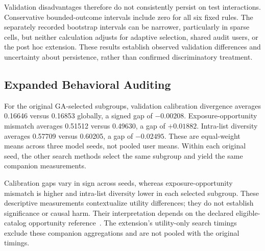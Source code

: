 Validation disadvantages therefore do not consistently persist on test interactions. Conservative bounded-outcome intervals include zero for all six fixed rules. The separately recorded bootstrap intervals can be narrower, particularly in sparse cells, but neither calculation adjusts for adaptive selection, shared audit users, or the post hoc extension. These results establish observed validation differences and uncertainty about persistence, rather than confirmed discriminatory treatment.

\subsection{Expanded Behavioral Auditing}

For the original GA-selected subgroups, validation calibration divergence averages 0.16646 versus 0.16853 globally, a signed gap of $-0.00208$. Exposure-opportunity mismatch averages 0.51512 versus 0.49630, a gap of $+0.01882$. Intra-list diversity averages 0.57709 versus 0.60205, a gap of $-0.02495$. These are equal-weight means across three model seeds, not pooled user means. Within each original seed, the other search methods select the same subgroup and yield the same companion measurements.

Calibration gaps vary in sign across seeds, whereas exposure-opportunity mismatch is higher and intra-list diversity lower in each selected subgroup. These descriptive measurements contextualize utility differences; they do not establish significance or causal harm. Their interpretation depends on the declared eligible-catalog opportunity reference~\cite{burke2017multisided,biega2018equity,singh2018fairness}. The extension's utility-only search timings exclude these companion aggregations and are not pooled with the original timings.
